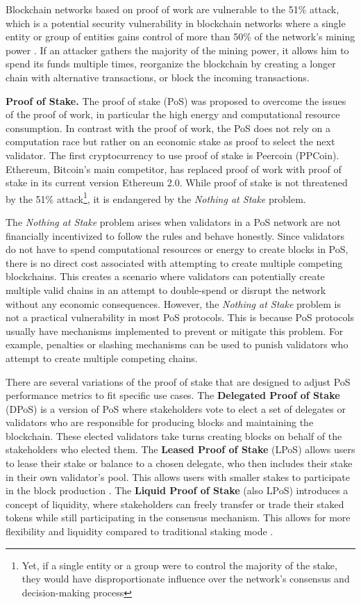 Blockchain networks based on proof of work are vulnerable to the 51\% attack, which is a potential security vulnerability in blockchain networks where a single entity or group of entities gains control 
of more than 50\% of the network's mining power \cite{Aponte2021}. 
If an attacker gathers the majority of the mining power, it allows him to spend its funds multiple times, reorganize the blockchain by creating a longer chain with alternative transactions, or block the incoming transactions.

\textbf{Proof of Stake.} The proof of stake (PoS) was proposed to overcome the issues of the proof of work, in particular the high energy and computational resource consumption. In contrast with the proof of work, the PoS does not rely on a computation race but rather on an economic stake as proof to select the next validator.
The first cryptocurrency to use proof of stake is Peercoin (PPCoin)\cite{King2012}.
Ethereum, Bitcoin's main competitor, has replaced proof of work with proof of stake in its current version Ethereum 2.0. 
While proof of stake is not threatened by the 51\% attack\footnote{Yet, if a single entity or a group were to control the majority of the stake, they would have disproportionate influence over the network's consensus and decision-making process}, it is endangered by the \emph{Nothing at Stake} problem. 

The \emph{Nothing at Stake} problem arises when validators in a PoS network
 are not financially incentivized to follow the rules and behave honestly. Since validators do not have to spend computational resources or energy to create blocks in PoS, there is no direct cost associated with attempting to create multiple competing blockchains.
 This creates a scenario where validators can potentially create multiple valid chains in an attempt to double-spend or disrupt the network without any economic consequences. 
However, the \emph{Nothing at Stake} problem is not a practical vulnerability in most PoS protocols. This is because PoS protocols usually have mechanisms implemented to prevent or mitigate this problem. 
For example, penalties or slashing mechanisms can be used to punish validators who attempt to create multiple competing chains.

There are several variations of the proof of stake that are designed to adjust PoS performance metrics to fit specific use cases.
The \textbf{Delegated Proof of Stake} (DPoS) is a version of PoS where stakeholders vote to elect a set of delegates or validators who are responsible for producing blocks and maintaining the blockchain. These elected validators take turns creating blocks on behalf of the stakeholders who elected them.
The \textbf{Leased Proof of Stake} (LPoS) allows users to lease their stake or balance to a chosen delegate, who then includes their stake in their own validator's pool. This allows users with smaller stakes to participate in the block production \cite{Salimitari2020}.
The \textbf{Liquid Proof of Stake} (also LPoS) introduces a concept of liquidity, where stakeholders can freely transfer or trade their staked tokens while still participating in the consensus mechanism. This allows for more flexibility and liquidity compared to traditional staking mode \cite{Breitman2014}.

